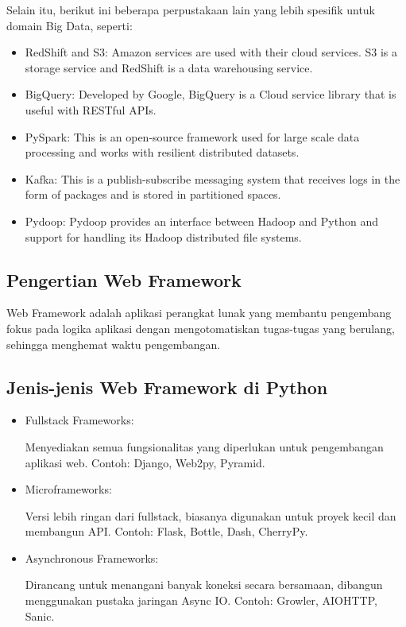 \documentclass{article}
\begin{document}
Selain itu, berikut ini beberapa perpustakaan lain yang lebih spesifik untuk domain Big Data, seperti:
\begin{itemize}
    \item RedShift and S3: Amazon services are used with their cloud services. S3 is a storage service and RedShift is a data warehousing service.
    \item BigQuery: Developed by Google, BigQuery is a Cloud service library that is useful with RESTful APIs.
    \item PySpark: This is an open-source framework used for large scale data processing and works with resilient distributed datasets.
    \item Kafka: This is a publish-subscribe messaging system that receives logs in the form of packages and is stored in partitioned spaces.
    \item Pydoop: Pydoop provides an interface between Hadoop and Python and support for handling its Hadoop distributed file systems.
\end{itemize}

\subsection{Pengertian Web Framework}
Web Framework adalah aplikasi perangkat lunak yang membantu pengembang fokus pada logika aplikasi dengan mengotomatiskan tugas-tugas yang berulang, sehingga menghemat waktu pengembangan.

\subsection{Jenis-jenis Web Framework di Python}
\begin{itemize}
    \item Fullstack Frameworks:

          Menyediakan semua fungsionalitas yang diperlukan untuk pengembangan aplikasi web. Contoh: Django, Web2py, Pyramid.
    \item Microframeworks:

          Versi lebih ringan dari fullstack, biasanya digunakan untuk proyek kecil dan membangun API. Contoh: Flask, Bottle, Dash, CherryPy.
    \item Asynchronous Frameworks:

          Dirancang untuk menangani banyak koneksi secara bersamaan, dibangun menggunakan pustaka jaringan Async IO. Contoh: Growler, AIOHTTP, Sanic.
\end{itemize}
\end{document}
